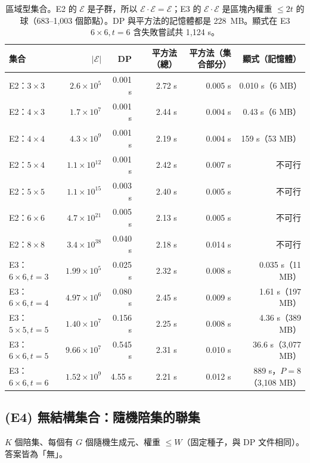 \documentclass[a4paper,11pt,fontset=none]{ctexart}
\newcommand{\E}{\mathcal{E}}
\theoremstyle{definition}
\begin{document}
\begin{table}[H]
\centering
\small
\begin{tabular}{@{}lrrrrr@{}}
\toprule
集合 & $\lvert\E\rvert$ & DP & 平方法（總） & 平方法（集合部分） & 顯式（記憶體）\\
\midrule
E2：$3\times3$ & $2.6\times10^5$ & 0.001 s & 2.72 s & 0.005 s & 0.010 s（6 MB）\\
E2：$4\times3$ & $1.7\times10^7$ & 0.001 s & 2.44 s & 0.004 s & 0.43 s（6 MB）\\
E2：$4\times4$ & $4.3\times10^9$ & 0.001 s & 2.19 s & 0.004 s & 159 s（53 MB）\\
E2：$5\times4$ & $1.1\times10^{12}$ & 0.001 s & 2.42 s & 0.007 s & 不可行\\
E2：$5\times5$ & $1.1\times10^{15}$ & 0.003 s & 2.40 s & 0.005 s & 不可行\\
E2：$6\times6$ & $4.7\times10^{21}$ & 0.005 s & 2.13 s & 0.005 s & 不可行\\
E2：$8\times8$ & $3.4\times10^{38}$ & 0.040 s & 2.18 s & 0.014 s & 不可行\\
\midrule
E3：$6\times6,t{=}3$ & $1.99\times10^5$ & 0.025 s & 2.32 s & 0.008 s & 0.035 s（11 MB）\\
E3：$6\times6,t{=}4$ & $4.97\times10^6$ & 0.080 s & 2.45 s & 0.009 s & 1.61 s（197 MB）\\
E3：$5\times5,t{=}5$ & $1.40\times10^7$ & 0.156 s & 2.25 s & 0.008 s & 4.36 s（389 MB）\\
E3：$6\times6,t{=}5$ & $9.66\times10^7$ & 0.545 s & 2.31 s & 0.010 s & 36.6 s（3,077 MB）\\
E3：$6\times6,t{=}6$ & $1.52\times10^9$ & 4.55 s & 2.21 s & 0.012 s & 889 s，$P=8$（3,108 MB）\\
\bottomrule
\end{tabular}
\caption{區域型集合。E2 的 $\E$ 是子群，所以 $\E\cdot\E=\E$；E3 的 $\E\cdot\E$ 是區塊內權重 $\le2t$ 的球（683--1,003 個節點）。DP 與平方法的記憶體都是 228~MB。顯式在 E3 $6\times6,t{=}6$ 含失敗嘗試共 1,124 s。}\label{tab:e23}
\end{table}

\subsection{(E4) 無結構集合：隨機陪集的聯集}

$K$ 個陪集、每個有 $G$ 個隨機生成元、權重 $\le W$（固定種子，與 DP 文件相同）。答案皆為「無」。
\end{document}
